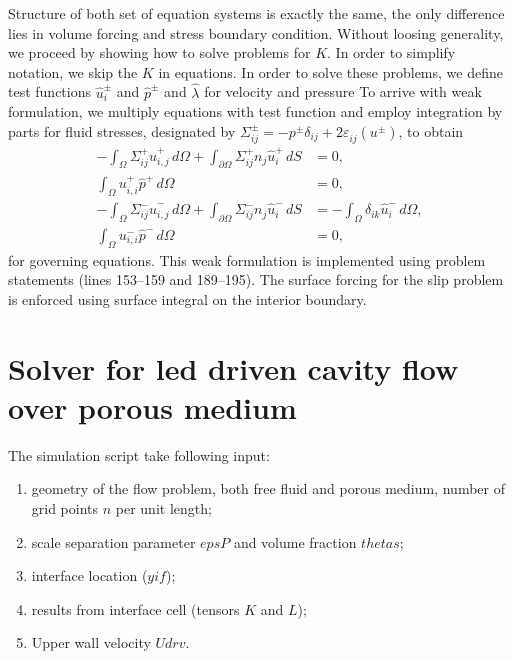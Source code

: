 \documentclass[12pt,a4paper]{article}
\newcommand{\pd}{\partial}
\newcommand{\str}[3]{\varepsilon^{#1}_{#2} \left( #3 \right)}
\begin{document}
Structure of both set of equation systems is exactly the same, the only difference lies in volume forcing and stress boundary condition. Without loosing generality, we proceed by showing how to solve problems for $K$. In order to simplify notation, we skip the $K$ in equations. In order to solve these problems, we define test functions $\hat{u}_i^{\pm}$ and $\hat{p}^{\pm}$ and $\hat{\lambda}$ for velocity and pressure To arrive with weak formulation, we multiply equations with test function and employ integration by parts for fluid stresses, designated by $\Sigma^{\pm}_{ij} = - p^{\pm} \delta_{ij} + 2 \str{}{ij}{u^{\pm}} $, to obtain
\begin{align}
- \int_{\Omega} \Sigma^{+}_{ij} \hat{u}^{+}_{i,j} \,\mathit{d\Omega} + \int_{\pd \Omega} \Sigma^{+}_{ij} n_j \hat{u}^{+}_{i} \,\mathit{dS} & = 0, \\
\int_{\Omega} u^{{+}}_{i,i} \hat{p}^{+} \,\mathit{d\Omega} & = 0, \\
- \int_{\Omega} \Sigma^{-}_{ij} \hat{u}^{-}_{i,j} \,\mathit{d\Omega} + \int_{\pd \Omega} \Sigma^{-}_{ij} n_j \hat{u}^{-}_{i} \,\mathit{dS} & = -\int_{\Omega} \delta_{ik} \hat{u}^{-}_{i} \,\mathit{d\Omega},  \\
\int_{\Omega} u^{{-}}_{i,i} \hat{p}^{-} \,\mathit{d\Omega} & = 0,
\end{align}
for governing equations. This weak formulation is implemented using problem statements (lines 153--159 and 189--195). The surface
forcing for the slip problem is enforced using surface integral on the interior boundary.

\section{Solver for led driven cavity flow over porous medium}

The simulation script take following input:
\begin{enumerate}
    \item geometry of the flow problem, both free fluid and porous medium, number of grid points $n$ per unit length;
	\item scale separation parameter $epsP$ and volume fraction $thetas$;
    \item interface location ($yif$);
    \item results from interface cell (tensors $K$ and $L$);
    \item Upper wall velocity $Udrv$.
\end{enumerate}
\end{document}

